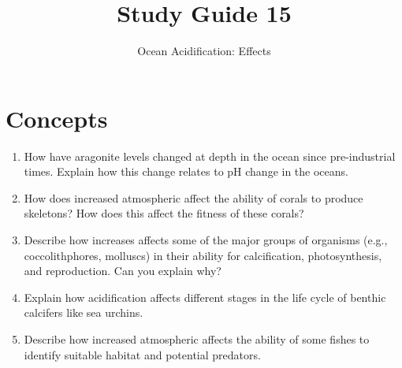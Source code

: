 \documentclass[nofonts, letterpaper]{tufte-handout}
\title{Study Guide 15}%
\author{Ocean Acidification: Effects}
\date{} %
\begin{document}
\maketitle	%



\section{Concepts}

\begin{enumerate}

\item How have aragonite levels changed at depth in the ocean since pre-industrial times. Explain how this change relates to pH change in the oceans.

\item How does increased atmospheric  affect the ability of corals to produce skeletons? How does this affect the fitness of these corals?

\item Describe how  increases affects some of the major groups of organisms (e.g., coccolithphores, molluscs) in their ability for calcification, photosynthesis, and reproduction. Can you explain why?

\item Explain how acidification affects different stages in the life cycle of benthic calcifers like sea urchins.

\item Describe how increased atmospheric  affects the ability of some fishes to identify suitable habitat and potential predators.

\end{enumerate}
\end{document}

